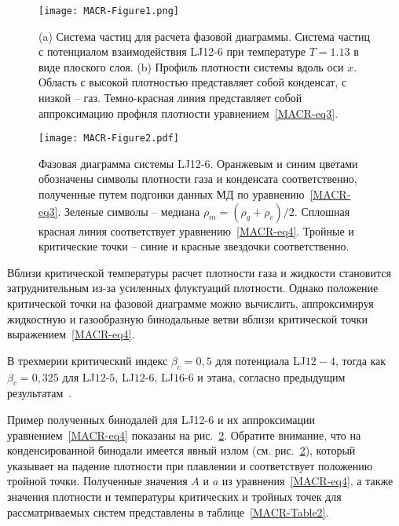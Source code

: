 \begin{figure}[!t]
  \centering
  \texttt{[image: MACR-Figure1.png]}
  \caption{(a) Система частиц для расчета фазовой диаграммы.
    Система частиц с потенциалом взаимодействия LJ12-6 при температуре $T=1.13$ в виде плоского слоя.
    (b) Профиль плотности системы вдоль оси $x$.
    Область с высокой плотностью представляет собой конденсат, с низкой -- газ.
    Темно-красная линия представляет собой аппроксимацию профиля плотности уравнением~\eqref{MACR-eq3}.}
  \label{MACR-Figure1}
\end{figure}


\begin{figure}[!t]
  \centering
  \texttt{[image: MACR-Figure2.pdf]}
  \caption{Фазовая диаграмма системы LJ12-6.
    Оранжевым и синим цветами обозначены символы плотности газа и конденсата соответственно, полученные путем подгонки данных МД по уравнению~\eqref{MACR-eq3}.
    Зеленые символы -- медиана $\rho_m=(\rho_g+\rho_c)/2$.
    Сплошная красная линия соответствует уравнению~\eqref{MACR-eq4}.
    Тройные и критические точки -- синие и красные звездочки соответственно.
  }
  \label{MACR-Figure2}
\end{figure}

Вблизи критической температуры расчет плотности газа и жидкости становится затруднительным из-за усиленных флуктуаций плотности.
Однако положение критической точки на фазовой диаграмме можно вычислить, аппроксимируя жидкостную и газообразную бинодальные ветви вблизи критической точки выражением~\ref{MACR-eq4}.

В трехмерии критический индекс $\beta_c = 0{,}5$ для потенциала LJ$12-4$, тогда как $\beta_c = 0{,}325$ для LJ$12$-$5$, LJ$12$-$6$, LJ$16$-$6$ и этана, согласно предыдущим результатам~\cite{10.1021/acs.jced.6b01036,10.1021/jp9072137,10.1103/physrevlett.89.025703}.

Пример полученных бинодалей для LJ12-6 и их аппроксимации уравнением~\eqref{MACR-eq4} показаны на рис.~\ref{MACR-Figure2}.
Обратите внимание, что на конденсированной бинодали имеется явный излом (см. рис.~\ref{MACR-Figure2}), который указывает на падение плотности при плавлении и соответствует положению тройной точки.
Полученные значения $A$ и $a$ из уравнения~\eqref{MACR-eq4}, а также значения плотности и температуры критических и тройных точек для рассматриваемых систем представлены в таблице~\ref{MACR-Table2}.


